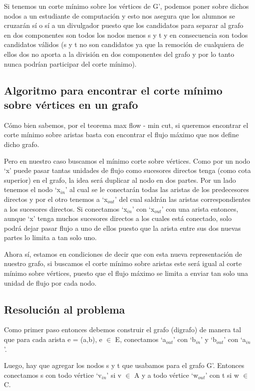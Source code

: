 Si tenemos un corte mínimo sobre los vértices de G', podemos poner sobre dichos nodos a un estudiante de computación y esto nos asegura que los alumnos se cruzarán sí o sí a un divulgador puesto que los candidatos para separar al grafo en dos componentes son todos los nodos menos s y t y en consecuencia son todos candidatos válidos (s y t no son candidatos ya que la remoción de cualquiera de ellos dos no aporta a la división en dos componentes del grafo y por lo tanto nunca podrían participar del corte mínimo). 

\subsection{Algoritmo para encontrar el corte mínimo sobre vértices en un grafo}

Cómo bien sabemos, por el teorema max flow - min cut, si queremos encontrar el corte mínimo sobre aristas basta con encontrar el flujo máximo que nos define dicho grafo.

Pero en nuestro caso buscamos el mínimo corte sobre vértices. Como por un nodo `x' puede pasar tantas unidades de flujo como sucesores directos tenga (como cota superior) en el grafo, la idea será duplicar al nodo en dos partes. Por un lado tenemos el nodo `x$_{in}$' al cual se le conectarán todas las aristas de los predecesores directos y por el otro tenemos a `x$_{out}$' del cual saldrán las aristas correspondientes a los sucesores directos. Si conectamos `x$_{in}$' con `x$_{out}$' con una arista entonces, aunque `x' tenga muchos sucesores directos a los cuales está conectado, solo podrá dejar pasar flujo a uno de ellos puesto que la arista entre sus dos nuevas partes lo limita a tan solo uno.

Ahora sí, estamos en condiciones de decir que con esta nueva representación de nuestro grafo, si buscamos el corte mínimo sobre aristas este será igual al corte mínimo sobre vértices, puesto que el flujo máximo se limita a enviar tan solo una unidad de flujo por cada nodo.

\subsection{Resolución al problema}

Como primer paso entonces debemos construir el grafo (digrafo) de manera tal que para cada arista e = (a,b), e $\in$ E, conectamos `a$_{out}$' con `b$_{in}$' y `b$_{out}$' con `a$_{in}$'.

Luego, hay que agregar los nodos s y t que usabamos para el grafo G'. Entonces conectamos s con todo vértice `v$_{in}$' si v $\in$ A y a todo vértice `w$_{out}$' con t si w $\in$ C.

